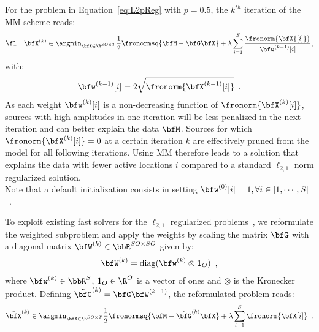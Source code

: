 For the problem in Equation~\eqref{eq:L2pReg} with $p=0.5$, the $k^{th}$ iteration of the MM scheme reads:
\begin{equation}
\label{eq:MM}
\fl \quad \bfX^{(k)} \in \argmin_{\bfX\in\R^{SO \times T}} \frac{1}{2} \fronormsq{\bfM - \bfG \bfX}  + \lambda \sum_{i=1}^S \frac{ \fronorm{\bfX{[i]}} }{ \bfw^{(k-1)}[i]},
\end{equation}
with:
\begin{equation*}
\bfw^{(k-1)}[i] = 2 \sqrt{\fronorm{\bfX^{(k-1)}[i]}} \enspace.
\end{equation*}
As each weight $\bfw^{(k)}[i]$ is a non-decreasing function of $\fronorm{\bfX^{(k)}[i]}$, sources with high amplitudes in one iteration will be less penalized in the next iteration and can better explain the data $\bfM$. Sources for which $\fronorm{\bfX^{(k)}[i]} = 0$ at a certain iteration $k$ are effectively pruned from the model for all following iterations. Using MM therefore leads to a solution that explains the data with fewer active locations $i$ compared to a standard $\ell_{2,1}$ norm regularized solution.\\
Note that a default initialization consists in setting $\bfw^{(0)}[i]=1, \forall i \in [1,\cdots, S]$~\cite{strohmeier-etal:16}.

To exploit existing fast solvers for the $\ell_{2,1}$ regularized problems~\cite{strohmeier-etal:16,Ndiaye_Fercoq_Gramfort_Salmon15}, we reformulate the weighted subproblem and apply the weights by scaling the matrix $\bfG$ with a diagonal matrix $\bfW^{(k)} \in \bbR^{SO \times SO}$ given by:
\begin{eqnarray} \label{eq:weights}
\bfW^{(k)} = \mathrm{diag}(\bfw^{(k)} \otimes \mathbf{1}_{O}) \enspace ,
\end{eqnarray}
where $\bfw^{(k)} \in \bbR^{S}$, $\mathbf{1}_{O}\in\R^O$ is a vector of ones and $\otimes$ is the Kronecker product.
Defining $\tilde{\bfG}^{(k)}=\bfG \bfW^{(k-1)}$, the reformulated problem reads:
\begin{eqnarray}\label{eq:lasso_new_gram}
\tilde{\bfX}^{(k)} \in \argmin_{\bfX\in\R^{SO \times T}} \frac{1}{2}\fronormsq{\bfM - \tilde{\bfG}^{(k)} \bfX}  + \lambda \sum_{i=1}^S \fronorm{\bfX[i]} \enspace .
\end{eqnarray}

